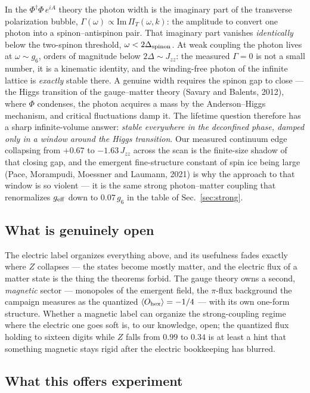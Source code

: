 \documentclass[11pt,a4paper]{article}
\newcommand{\Jzz}{J_{zz}}
\newcommand{\gsix}{g_6}
\newcommand{\Ohex}{O_{\rm hex}}
\begin{document}
In the $\Phi^\dagger\Phi\,e^{iA}$ theory the photon width is the imaginary
part of the transverse polarization bubble, $\Gamma(\omega)\propto
\mathrm{Im}\,\Pi_T(\omega,k)$: the amplitude to convert one photon into a
spinon--antispinon pair.  That imaginary part vanishes \emph{identically}
below the two-spinon threshold, $\omega<2\Delta_{\rm spinon}$.  At weak
coupling the photon lives at $\omega\sim\gsix$, orders of magnitude below
$2\Delta\sim\Jzz$: the measured $\Gamma=0$ is not a small number, it is a
kinematic identity, and the winding-free photon of the infinite lattice is
\emph{exactly} stable there.  A genuine width requires the spinon gap to
close --- the Higgs transition of the gauge--matter theory (Savary and
Balents, 2012), where $\Phi$ condenses, the photon acquires a mass by the
Anderson--Higgs mechanism, and critical fluctuations damp it.  The lifetime
question therefore has a sharp infinite-volume answer: \emph{stable
everywhere in the deconfined phase, damped only in a window around the
Higgs transition}.  Our measured continuum edge collapsing from $+0.67$ to
$-1.63\,\Jzz$ across the scan is the finite-size shadow of that closing gap,
and the emergent fine-structure constant of spin ice being large (Pace,
Morampudi, Moessner and Laumann, 2021) is why the approach to that window is
so violent --- it is the same strong photon--matter coupling that
renormalizes $g_{\rm eff}$ down to $0.07\,\gsix$ in the table of
Sec.~\ref{sec:strong}.

\subsection{What is genuinely open}

The electric label organizes everything above, and its usefulness fades
exactly where $Z$ collapses --- the states become mostly matter, and the
electric flux of a matter state is the thing the theorems forbid.  The
gauge theory owns a second, \emph{magnetic} sector --- monopoles of the
emergent field, the $\pi$-flux background the campaign measures as the
quantized $\langle\Ohex\rangle=-1/4$ --- with its own one-form structure.
Whether a magnetic label can organize the strong-coupling regime where the
electric one goes soft is, to our knowledge, open; the quantized flux
holding to sixteen digits while $Z$ falls from $0.99$ to $0.34$ is at least
a hint that something magnetic stays rigid after the electric bookkeeping
has blurred.

\subsection{What this offers experiment}
\label{sec:experiment}
\end{document}

